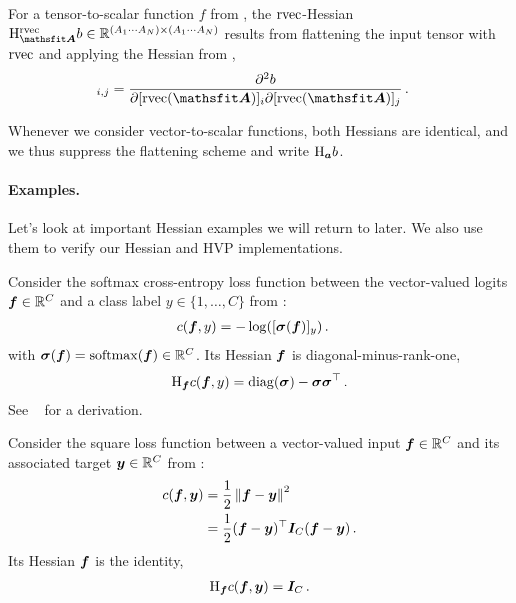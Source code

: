 \begin{definition}\label{def:rvec_hessian}
  For a tensor-to-scalar function $f$ from , the $\operatorname{rvec}$-Hessian $\hess_{\tA}^{\rvec}b \in \sR^{(A_1 \cdots A_N) \times (A_1 \cdots A_N)}$ results from flattening the input tensor with $\operatorname{rvec}$ and applying the Hessian from ,
  \begin{align*}
    [\hess^{\rvec}_{\tA}b]_{i, j}
     & =
    \frac{\partial^2 b}{\partial [\rvec(\tA)]_{i} \partial [\rvec(\tA)]_{j}}\,.
  \end{align*}
\end{definition}

Whenever we consider vector-to-scalar functions, both Hessians are identical, and we thus suppress the flattening scheme and write $\mathrm{H}_{{\bm{a}}}b$.

\paragraph{Examples.}
Let's look at important Hessian examples we will return to later.
We also use them to verify our Hessian and HVP implementations.

\switchcolumn[1]
\switchcolumn[0]

\begin{example}\label{ex:hessian-crossentropyloss}
  Consider the softmax cross-entropy loss function between the vector-valued logits ${\bm{f}} \in {\mathbb{R}}^C$ and a class label $y \in \{1, \dots, C\}$ from :
  \begin{align*}
    c({\bm{f}}, y)
     & =
    -\log([{\bm{\sigma}}({\bm{f}})]_y)\,.
  \end{align*}
  with ${\bm{\sigma}}({\bm{f}}) = \mathrm{softmax}({\bm{f}}) \in {\mathbb{R}}^C$.
  Its Hessian \wrt ${\bm{f}}$ is diagonal-minus-rank-one,
  \begin{align*}
    \mathrm{H}_{{\bm{f}}} c({\bm{f}}, y)
    =
    \operatorname{diag}({\bm{\sigma}}) - {\bm{\sigma}} {\bm{\sigma}}^\top\,.
  \end{align*}
  See \eg~\citet{dangel2020modular} for a derivation.
\end{example}

\switchcolumn[1]

\switchcolumn[0]
\begin{example}\label{ex:square_loss_hessian}
  Consider the square loss function between a vector-valued input ${\bm{f}} \in {\mathbb{R}}^C$ and its associated target ${\bm{y}} \in {\mathbb{R}}^C$ from :
  \begin{align*}
    c({\bm{f}}, {\bm{y}})
     & =
    \frac{1}{2}\left\lVert
    {\bm{f}} - {\bm{y}}
    \right\rVert^2
    \\
     & =
    \frac{1}{2}({\bm{f}} - {\bm{y}})^{\top} {\bm{I}}_C ({\bm{f}} - {\bm{y}})\,.
  \end{align*}
  Its Hessian \wrt ${\bm{f}}$ is the identity,
  \begin{align*}
    \mathrm{H}_{{\bm{f}}} c({\bm{f}}, {\bm{y}})
    =
    {\bm{I}}_C\,.
  \end{align*}
\end{example}

